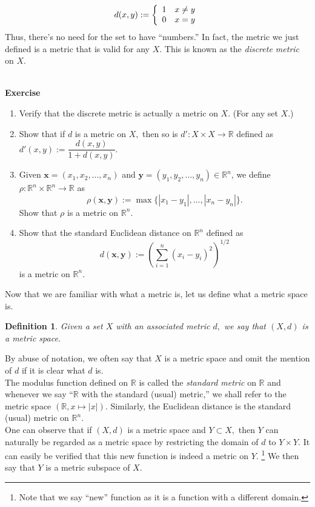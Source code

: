 \documentclass{article}
\newtheorem{defn}{Definition}
\newcounter{exercise}
\newcommand{\exercise}{\refstepcounter{exercise}\par\medskip
   {\textbf{Exercise \theexercise }} \rmfamily}
\begin{document}
	\[d(x, y) := \left\{\begin{array}{c r}
		1 & x \neq y\\
		0 & x = y
	\end{array}
	\right.\]
	Thus, there's no need for the set to have ``numbers.'' In fact, the metric we just defined is a metric that is valid for any $X.$ This is known as the \emph{discrete metric} on $X.$\\~\\
	\exercise
	\begin{enumerate}[nosep]\label{ex:standard-metrics}
		\item Verify that the discrete metric is actually a metric on $X.$ (For any set $X.$)
		\item Show that if $d$ is a metric on $X,$ then so is $d' : X \times X \to \mathbb{R}$ defined as $d'(x, y) := \dfrac{d(x, y)}{1 + d(x, y)}.$
		\item Given $\textbf{x} = (x_1, x_2, \ldots, x_n)$ and $\textbf{y} = (y_1, y_2, \ldots, y_n) \in \mathbb{R}^n$, we define $\rho:\mathbb{R}^n\times \mathbb{R}^n \to \mathbb{R}$ as
		\[\rho(\textbf{x}, \textbf{y}) := \max\{|x_1 - y_1|, \ldots, |x_n - y_n|\}.\]
		Show that $\rho$ is a metric on $\mathbb{R}^n.$
		\item Show that the standard Euclidean distance on $\mathbb{R}^n$ defined as 
		\[d(\textbf{x}, \textbf{y}) := \left(\sum_{i=1}^{n}(x_i - y_i)^2\right)^{1/2}\]
		is a metric on $\mathbb{R}^n.$
	\end{enumerate}
	Now that we are familiar with what a metric is, let us define what a metric space is.
	\begin{defn}
		Given a set $X$ with an associated metric $d,$ we say that $(X, d)$ is a metric space.
	\end{defn}
	By abuse of notation, we often say that $X$ is a metric space and omit the mention of $d$ if it is clear what $d$ is.\\
	The modulus function defined on $\mathbb{R}$ is called the \emph{standard metric} on $\mathbb{R}$ and whenever we say ``$\mathbb{R}$ with the standard (usual) metric,'' we shall refer to the metric space $(\mathbb{R}, x \mapsto |x|).$ Similarly, the Euclidean distance is the standard (usual) metric on $\mathbb{R}^n.$\\
	One can observe that if $(X, d)$ is a metric space and $Y \subset X,$ then $Y$ can naturally be regarded as a metric space by restricting the domain of $d$ to $Y \times Y.$ It can easily be verified that this new function is indeed a metric on $Y.$ \footnote{Note that we say ``new'' function as it is a function with a different domain.} We then say that $Y$ is a metric subspace of $X.$
\end{document}
